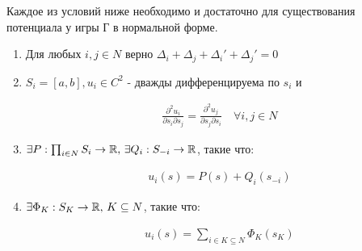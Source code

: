     \begin{thm}
      \label{theorem:iff_for_potential}
      Каждое из условий ниже необходимо и достаточно для существования потенциала у игры Г в нормальной форме.

	\begin{enumerate}
		\item \label{theorem_equation:iff_potential_deltas} Для любых  $i, j \in N$ верно  $\Delta_i + \Delta_j + \Delta_i' + \Delta_j' = 0$

		\item \label{theorem_equation:iff_potential_partial} $S_i = [a, b], u_i \in C^2$ - дважды дифференцируема по $s_i$ и

			\begin{align*}
				\frac{\partial^2 u_i}{\partial s_i \partial s_j} = \frac{\partial^2 u_j}{\partial s_j \partial s_i} \quad \forall i, j \in N
			\end{align*}

		      \item \label{theorem_equation:iff_potential_P_Q}$\exists P: \prod_{i \in N}S_i \to \mathbb{R}, \, \exists Q_i: S_{-i} \to \mathbb{R}$, такие что:

			\begin{align*}
				u_i(s) = P(s) + Q_i(s_{-i})
			\end{align*}

		\item \label{theorem_equation:iff_potential_Phi} $\exists \Phi_K : S_K \to \mathbb{R}, \, K \subseteq N$, такие что: 

			 \begin{align*}
				 u_i(s) = \sum_{i \in K \subseteq N}\Phi_K(s_K)
			\end{align*}

	\end{enumerate}
\end{thm}

